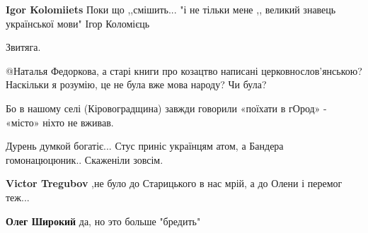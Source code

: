 \begin{itemize}
\begin{itemize}
\textbf{Igor Kolomiiets} Поки що ,,смішить... "і не тільки мене ,, великий знавець української мови" Ігор Коломієць

 
Звитяга.

 

@Наталья Федоркова, а старі книги про козацтво написані церковнослов’янською?
Наскільки я розумію, це не була вже мова народу? Чи була?

Бо в нашому селі (Кіровоградщина) завжди говорили «поїхати в гОрод» - «місто»
ніхто не вживав.

 
Дурень думкой богатіє... Стус приніс українцям атом, а Бандера гомонацюцюник.. Скаженіли зовсім.

 
\textbf{Victor Tregubov} ,не було до Старицького в нас мрій, а до Олени і перемог теж...

 
\textbf{Олег Широкий} да, но это больше "бредить"

 

\end{itemize}
\end{itemize}
